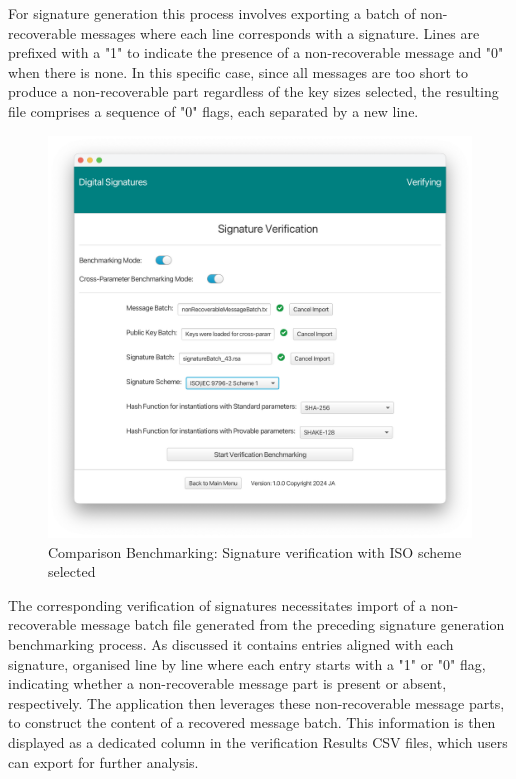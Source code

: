 \documentclass[]{final_report}
\begin{document}
For signature generation this process involves exporting a batch of non-recoverable messages where each line corresponds with a signature. Lines are prefixed with a "1" to indicate the presence of a non-recoverable message and "0" when there is none. In this specific case, since all messages are too short to produce a non-recoverable part regardless of the key sizes selected, the resulting file comprises a sequence of "0" flags, each separated by a new line.


\begin{figure}[H]
    \centering
    \includegraphics[width=\textwidth]{main_pictures/ui/verifying/verifying10.png}
   \caption{Comparison Benchmarking: Signature verification with ISO scheme selected}
\end{figure}

The corresponding verification of signatures necessitates import of a non-recoverable message batch file generated from the preceding signature generation benchmarking process. As discussed it contains entries aligned with each signature, organised line by line where each entry starts with a "1" or "0" flag, indicating whether a non-recoverable message part is present or absent, respectively. The application then leverages these non-recoverable message parts, to construct the content of a recovered message batch. This information is then displayed as a dedicated column in the verification Results CSV files, which users can export for further analysis.
\end{document}
